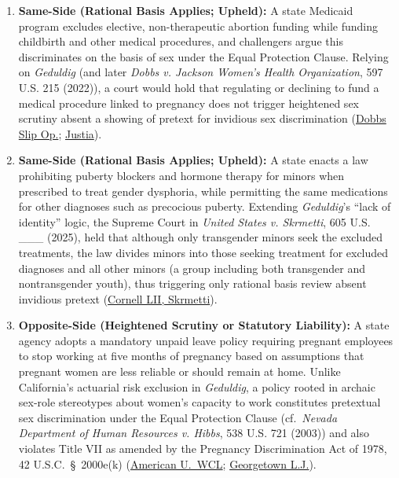 \documentclass[12pt]{article}
\begin{document}
\begin{enumerate}
  \item \textbf{Same-Side (Rational Basis Applies; Upheld):} A state Medicaid program excludes elective, non-therapeutic abortion funding while funding childbirth and other medical procedures, and challengers argue this discriminates on the basis of sex under the Equal Protection Clause. Relying on \textit{Geduldig} (and later \textit{Dobbs v. Jackson Women's Health Organization}, 597 U.S. 215 (2022)), a court would hold that regulating or declining to fund a medical procedure linked to pregnancy does not trigger heightened sex scrutiny absent a showing of pretext for invidious sex discrimination (\href{https://www.supremecourt.gov/opinions/21pdf/19-1392_6j37.pdf}{Dobbs Slip Op.}; \href{https://supreme.justia.com/cases/federal/us/417/484/}{Justia}).
  \item \textbf{Same-Side (Rational Basis Applies; Upheld):} A state enacts a law prohibiting puberty blockers and hormone therapy for minors when prescribed to treat gender dysphoria, while permitting the same medications for other diagnoses such as precocious puberty. Extending \textit{Geduldig}'s ``lack of identity'' logic, the Supreme Court in \textit{United States v. Skrmetti}, 605 U.S. \_\_\_ (2025), held that although only transgender minors seek the excluded treatments, the law divides minors into those seeking treatment for excluded diagnoses and all other minors (a group including both transgender and nontransgender youth), thus triggering only rational basis review absent invidious pretext (\href{https://www.law.cornell.edu/supremecourt/text/23-477}{Cornell LII, Skrmetti}).
  \item \textbf{Opposite-Side (Heightened Scrutiny or Statutory Liability):} A state agency adopts a mandatory unpaid leave policy requiring pregnant employees to stop working at five months of pregnancy based on assumptions that pregnant women are less reliable or should remain at home. Unlike California's actuarial risk exclusion in \textit{Geduldig}, a policy rooted in archaic sex-role stereotypes about women's capacity to work constitutes pretextual sex discrimination under the Equal Protection Clause (cf.\ \textit{Nevada Department of Human Resources v. Hibbs}, 538 U.S. 721 (2003)) and also violates Title VII as amended by the Pregnancy Discrimination Act of 1978, 42 U.S.C.\ \S~2000e(k) (\href{https://digitalcommons.wcl.american.edu/cgi/viewcontent.cgi?article=1409&context=facsch_bk_contributions}{American U.\ WCL}; \href{https://www.law.georgetown.edu/georgetown-law-journal/wp-content/uploads/sites/26/2020/07/The-Pregnant-Citizen-from-Suffrage-to-the-Present.pdf}{Georgetown L.J.}).

\end{enumerate}
\end{document}
